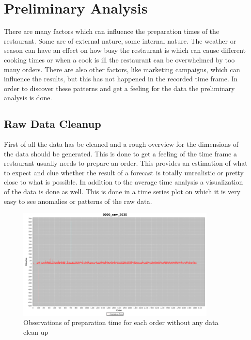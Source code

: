 \section{Preliminary Analysis}\label{section:Preliminary Analysis}
There are many factors which can influence the preparation times of the restaurant. Some are of external nature, some internal nature. The weather or season can have an effect on how busy the restaurant is which can cause different cooking times or when a cook is ill the restaurant can be overwhelmed by too many orders.\newline
There are also other factors, like marketing campaigns, which can influence the results, but this has not happened in the recorded time frame.\newline
In order to discover these patterns and get a feeling for the data the preliminary analysis is done.
\subsection{Raw Data Cleanup}\label{subsection:Raw Data Cleanup}
First of all the data has be cleaned and a rough overview for the dimensions of the data should be generated. This is done to get a feeling of the time frame a restaurant usually needs to prepare an order. This provides an estimation of what to expect and clue whether the result of a forecast is totally unrealistic or pretty close to what is possible. In addition to the average time analysis a visualization of the data is done as well. This is done in a time series plot on which it is very easy to see anomalies or patterns of the raw data.\newline

\begin{figure}[h]
\begin{center}
\includegraphics[width=10cm]{images/0000_raw_3035.png}
\caption{Observations of preparation time for each order without any data clean up}
\label{fig:0000_raw_3035}
\end{center}
\end{figure}

